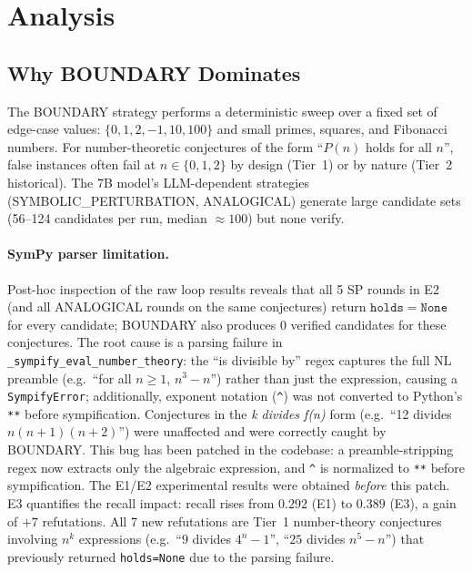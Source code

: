 \section{Analysis}
\label{sec:analysis}

\subsection{Why BOUNDARY Dominates}

The BOUNDARY strategy performs a deterministic sweep over a fixed set of
edge-case values: $\{0, 1, 2, -1, 10, 100\}$ and small primes, squares,
and Fibonacci numbers.
For number-theoretic conjectures of the form ``$P(n)$ holds for all $n$'',
false instances often fail at $n \in \{0, 1, 2\}$ by design (Tier~1) or by
nature (Tier~2 historical).
The 7B model's LLM-dependent strategies (SYMBOLIC\_PERTURBATION, ANALOGICAL)
generate large candidate sets (56--124 candidates per run, median ${\approx}100$) but none verify.

\paragraph{SymPy parser limitation.}
Post-hoc inspection of the raw loop results reveals that all 5 SP rounds in
E2 (and all ANALOGICAL rounds on the same conjectures) return
$\mathtt{holds=None}$ for every candidate; BOUNDARY also produces 0 verified
candidates for these conjectures.
The root cause is a parsing failure in \texttt{\_sympify\_eval\_number\_theory}:
the ``is divisible by'' regex captures the full NL preamble
(e.g.\ ``for all $n \geq 1$, $n^3-n$'') rather than just the expression,
causing a \texttt{SympifyError}; additionally, exponent notation
(\texttt{\^}) was not converted to Python's \texttt{**} before sympification.
Conjectures in the \emph{k divides f(n)} form (e.g.\ ``12 divides
$n(n{+}1)(n{+}2)$'') were unaffected and were correctly caught by BOUNDARY.
This bug has been patched in the codebase: a preamble-stripping regex now
extracts only the algebraic expression, and \texttt{\^} is normalized to
\texttt{**} before sympification.
The E1/E2 experimental results were obtained \emph{before} this patch.
E3 quantifies the recall impact: recall rises from $0.292$ (E1) to $0.389$ (E3),
a gain of $+7$ refutations.
All 7 new refutations are Tier~1 number-theory conjectures involving
$n^k$ expressions (e.g.\ ``$9$ divides $4^n-1$'', ``$25$ divides $n^5-n$'')
that previously returned \texttt{holds=None} due to the parsing failure.

